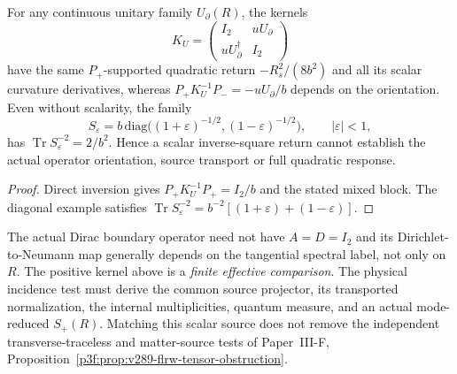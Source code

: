 \documentclass[12pt,a4paper]{article}
\begin{document}
\begin{proposition}
\label{p3e:prop:v353-schur-orientation}
For any continuous unitary family $U_\partial(R)$, the kernels
\[
 K_U=\begin{pmatrix}I_2&uU_\partial\\
 uU_\partial^\dagger&I_2\end{pmatrix}
\]
have the same $P_+$-supported quadratic return
$-R_s^2/(8b^2)$ and all its scalar curvature derivatives, whereas
$P_+K_U^{-1}P_-=-uU_\partial/b$ depends on the orientation.
Even without scalarity, the family
\[
 S_\varepsilon=b\,\mathrm{diag}\bigl((1+\varepsilon)^{-1/2},
                     (1-\varepsilon)^{-1/2}\bigr),\qquad
 |\varepsilon|<1,
\]
has $\operatorname{Tr}S_\varepsilon^{-2}=2/b^2$.
Hence a scalar inverse-square return cannot establish the actual
operator orientation, source transport or full quadratic response.
\end{proposition}
\begin{proof}
Direct inversion gives $P_+K_U^{-1}P_+=I_2/b$ and
the stated mixed block.  The diagonal example satisfies
$\operatorname{Tr}S_\varepsilon^{-2}
=b^{-2}[(1+\varepsilon)+(1-\varepsilon)]$.
\end{proof}

\begin{remark}
\label{p3e:rem:v353-schur-native-firewall}
The actual Dirac boundary operator need not have $A=D=I_2$ and
its Dirichlet-to-Neumann map generally depends on the tangential
spectral label, not only on $R$.  The positive kernel above is a
\emph{finite effective comparison}.  The physical incidence test
must derive the common source projector, its transported normalization,
the internal multiplicities, quantum measure, and an actual
mode-reduced $S_+(R)$.  Matching this scalar source does not
remove the independent transverse-traceless and matter-source tests
of Paper~III-F, Proposition~\ref{p3f:prop:v289-flrw-tensor-obstruction}.
\end{remark}
\end{document}
